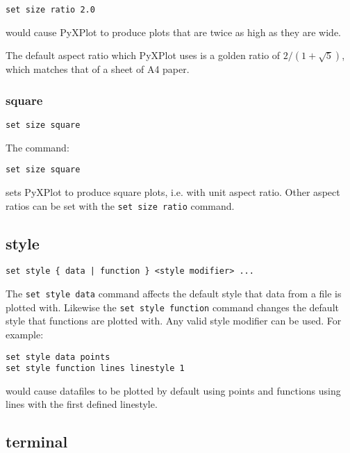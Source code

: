 \documentclass[a4paper,onecolumn,11pt]{book}
\begin{document}
\begin{verbatim}
set size ratio 2.0
\end{verbatim}

\noindent would cause PyXPlot to produce plots that are twice as high as they are wide.

The default aspect ratio which PyXPlot uses is a golden ratio of
$2/(1+\sqrt{5})$, which matches that of a sheet of A4 paper.


\subsubsection{square}

\begin{verbatim}
set size square
\end{verbatim}

The command:

\begin{verbatim}
set size square
\end{verbatim}

\noindent sets PyXPlot to produce square plots, i.e. with unit aspect ratio. Other aspect
ratios can be set with the {\tt set size ratio} command.

\subsection{style}

\begin{verbatim}
set style { data | function } <style modifier> ...
\end{verbatim}

The {\tt set style data} command affects the default style that data from a file
is plotted with.  Likewise the {\tt set style function} command changes the
default style that functions are plotted with.  Any valid style modifier can be
used.  For example:

\begin{verbatim}
set style data points
set style function lines linestyle 1
\end{verbatim}

\noindent would cause datafiles to be plotted by default using points and
functions using lines with the first defined linestyle.
 
\subsection{terminal}
\end{document}
